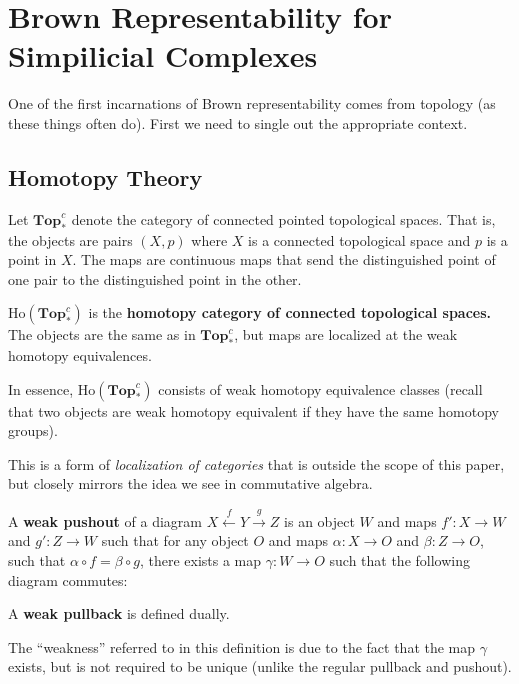 \documentclass[12pt]{article}
\newcommand*{\pTopc}{\mathbf{Top}_\ast^c}
\begin{document}
\section{Brown Representability for Simpilicial Complexes}
One of the first incarnations of Brown representability comes from topology (as these things often do). First we need to single out 
the appropriate context.

\subsection{Homotopy Theory}
\begin{defn}
	Let $\pTopc$ denote the category of connected pointed topological spaces. That is, the objects are pairs $(X,p)$ where $X$ is a connected 
	topological space and $p$ is a point in $X$. The maps are continuous maps that send the distinguished point of one pair to the distinguished point in the other.
\end{defn}
\begin{defn}
	$\text{Ho}(\pTopc)$ is the \textbf{homotopy category of connected topological spaces.} The objects are the same as in $\pTopc$, 
	but maps are localized at the weak homotopy equivalences.
\end{defn}
\begin{rmk}
	In essence, $\text{Ho}(\pTopc)$ consists of weak homotopy equivalence classes (recall that two objects are weak homotopy equivalent if they have the same 
	homotopy groups).
\end{rmk}
\begin{rmk}
	This is a form of \textit{localization of categories} that is outside the scope of this paper, but closely mirrors the idea 
	we see in commutative algebra.
\end{rmk}
\begin{defn}
	A \textbf{weak pushout} of a diagram $X\xleftarrow{f}Y\xrightarrow{g}Z$ is an object $W$ and maps 
	$f':X\to W$ and $g':Z\to W$ such that for any object $O$ and maps $\alpha:X\to O$ and $\beta:Z\to O$, 
	such that $\alpha\circ f=\beta\circ g$, there exists a map $\gamma:W\to O$ such that the following diagram commutes:
	\begin{center}
	\end{center}

	A \textbf{weak pullback} is defined dually.
\end{defn}
\begin{rmk}
	The ``weakness'' referred to in this definition is due to the fact that the map $\gamma$ exists, but is not 
	required to be unique (unlike the regular pullback and pushout).
\end{rmk}
\end{document}
